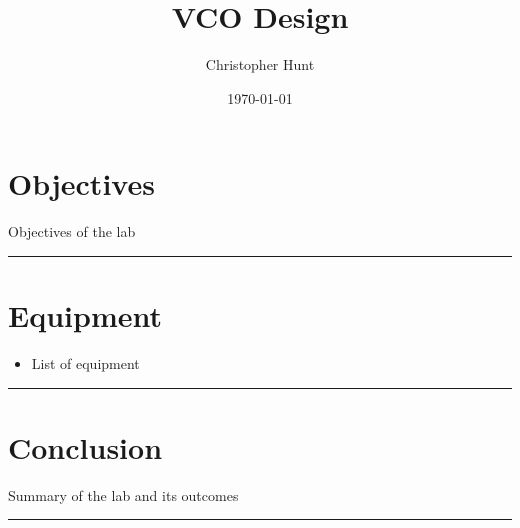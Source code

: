 \documentclass{article}
\title{\textbf{{\huge VCO Design}}}
\author{Christopher Hunt}
\date{\today}
\begin{document}
\pagestyle{fancy}
\fancyhf{}
\rhead{\thepage}
\maketitle
\section*{\textcolor{mycolor}{Objectives}}
Objectives of the lab
\vspace{5mm}
\hrule

\section*{\textcolor{mycolor}{Equipment}}
\begin{itemize}
  \item List of equipment
\end{itemize}
\vspace{5mm}
\hrule

\section*{\textcolor{mycolor}{Conclusion}}
Summary of the lab and its outcomes
\vspace{5mm}
\hrule
\end{document}
